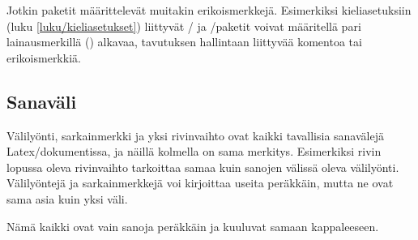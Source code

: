 
Jotkin paketit määrittelevät muitakin erikoismerkkejä. Esimerkiksi
kieliasetuksiin (luku \ref{luku/kieliasetukset}) liittyvät
\-/{} ja \-/paketit voivat
määritellä pari lainausmerkillä (\koodi{\textquotedbl}) alkavaa,
tavutuksen hallintaan liittyvää komentoa tai erikoismerkkiä.

\subsection{Sanaväli}
\label{luku/sanaväli}

Välilyönti, sarkainmerkki ja yksi rivinvaihto ovat kaikki tavallisia
sanavälejä Latex\-/dokumentissa, ja näillä kolmella on sama merkitys.
Esimerkiksi rivin lopussa oleva rivinvaihto tarkoittaa samaa kuin
sanojen välissä oleva välilyönti. Välilyöntejä ja sarkainmerkkejä voi
kirjoittaa useita peräkkäin, mutta ne ovat sama asia kuin yksi väli.

\begin{koodilohkosis}
Nämä      kaikki
     ovat            vain
sanoja  peräkkäin  ja               kuuluvat
    samaan kappaleeseen.
\end{koodilohkosis}

